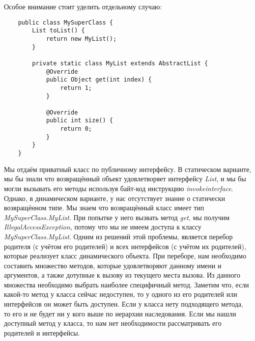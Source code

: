Особое внимание стоит уделить отдельному случаю:

\begin{verbatim}
    public class MySuperClass {
        List toList() {
            return new MyList();
        }
    
        private static class MyList extends AbstractList {
            @Override
            public Object get(int index) {
                return 1;
            }
    
            @Override
            public int size() {
                return 0;
            }
        }
    }
\end{verbatim}

Мы отдаём приватный класс по публичному интерфейсу. В статическом варианте, мы бы знали что возвращённый объект удовлетворяет интерфейсу \textit{List}, и мы бы могли вызывать его методы используя байт-код инструкцию \textit{invokeinterface}. Однако, в динамическом варианте, у нас отсутствует знание о статически возвращённом типе. Мы знаем что возвращённый класс имеет тип \textit{MySuperClass.MyList}. При попытке у него вызвать метод \textit{get}, мы получим \textit{IllegalAccessException}, потому что мы не имеем доступа к классу \textit{MySuperClass.MyList}. Одним из решений этой проблемы, является перебор родителя (с учётом его родителей) и всех интерфейсов (с учётом их родителей), которые реализует класс динамического объекта. При переборе, нам необходимо составить множество методов, которые удовлетворяют данному имени и аргументов, а также дотупные к вызову из текущего места вызова. Из данного множества необходимо выбрать наиболее специфичный метод. Заметим что, если какой-то метод у класса сейчас недоступен, то у одного из его родителей или интерфейсов он может быть доступен. Если у класса нету подходящего метода, то его и не будет ни у кого выше по иерархии наследования. Если мы нашли доступный метод у класса, то нам нет необходимости рассматривать его родителей и интерфейсы.


